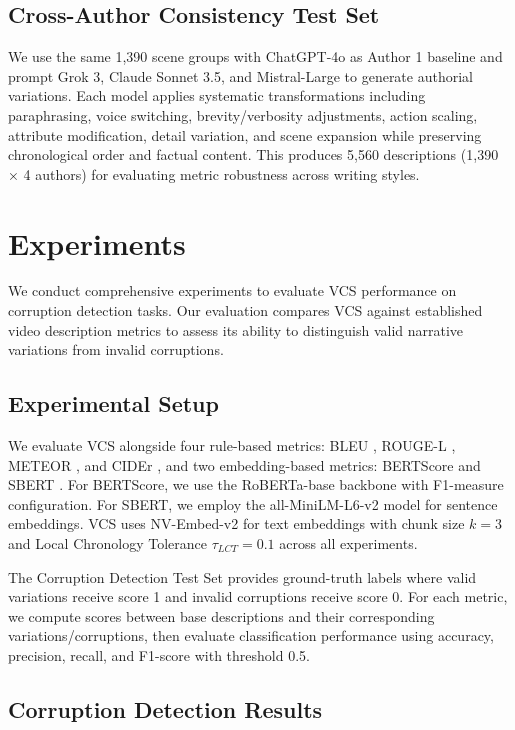 \documentclass[letterpaper]{article} %
\begin{document}
\subsection{Cross-Author Consistency Test Set}
We use the same 1,390 scene groups with ChatGPT-4o as Author 1 baseline and prompt Grok 3, Claude Sonnet 3.5, and Mistral-Large to generate authorial variations. Each model applies systematic transformations including paraphrasing, voice switching, brevity/verbosity adjustments, action scaling, attribute modification, detail variation, and scene expansion while preserving chronological order and factual content. This produces 5,560 descriptions (1,390 × 4 authors) for evaluating metric robustness across writing styles.

\section{Experiments}

We conduct comprehensive experiments to evaluate VCS performance on corruption detection tasks. Our evaluation compares VCS against established video description metrics to assess its ability to distinguish valid narrative variations from invalid corruptions.

\subsection{Experimental Setup}

We evaluate VCS alongside four rule-based metrics: BLEU \citep{p:02}, ROUGE-L \citep{l:04}, METEOR \citep{bl:05}, and CIDEr \citep{v:15}, and two embedding-based metrics: BERTScore \citep{z:20} and SBERT \citep{r:19}. For BERTScore, we use the RoBERTa-base backbone with F1-measure configuration. For SBERT, we employ the all-MiniLM-L6-v2 model for sentence embeddings. VCS uses NV-Embed-v2 for text embeddings with chunk size $k=3$ and Local Chronology Tolerance $\tau_{LCT}=0.1$ across all experiments.

The Corruption Detection Test Set provides ground-truth labels where valid variations receive score 1 and invalid corruptions receive score 0. For each metric, we compute scores between base descriptions and their corresponding variations/corruptions, then evaluate classification performance using accuracy, precision, recall, and F1-score with threshold 0.5.

\subsection{Corruption Detection Results}
\end{document}

